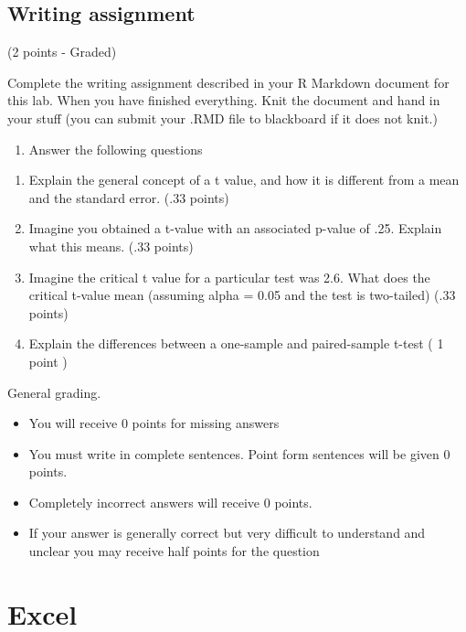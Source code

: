 \documentclass[]{book}
\providecommand{\tightlist}{%
  \setlength{\itemsep}{0pt}\setlength{\parskip}{0pt}}
\begin{document}
\subsection{Writing assignment}\label{writing-assignment-5}

(2 points - Graded)

Complete the writing assignment described in your R Markdown document
for this lab. When you have finished everything. Knit the document and
hand in your stuff (you can submit your .RMD file to blackboard if it
does not knit.)

\begin{enumerate}
\def\labelenumi{\arabic{enumi}.}
\tightlist
\item
  Answer the following questions
\end{enumerate}

\begin{enumerate}
\def\labelenumi{\alph{enumi}.}
\item
  Explain the general concept of a t value, and how it is different from
  a mean and the standard error. (.33 points)
\item
  Imagine you obtained a t-value with an associated p-value of .25.
  Explain what this means. (.33 points)
\item
  Imagine the critical t value for a particular test was 2.6. What does
  the critical t-value mean (assuming alpha = 0.05 and the test is
  two-tailed) (.33 points)
\item
  Explain the differences between a one-sample and paired-sample t-test
  ( 1 point )
\end{enumerate}

General grading.

\begin{itemize}
\tightlist
\item
  You will receive 0 points for missing answers
\item
  You must write in complete sentences. Point form sentences will be
  given 0 points.
\item
  Completely incorrect answers will receive 0 points.
\item
  If your answer is generally correct but very difficult to understand
  and unclear you may receive half points for the question
\end{itemize}

\section{Excel}\label{excel-6}
\end{document}
